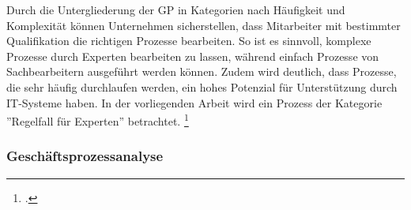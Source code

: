 Durch die Untergliederung der GP in Kategorien nach Häufigkeit und Komplexität können Unternehmen sicherstellen, dass Mitarbeiter mit bestimmter Qualifikation die richtigen Prozesse bearbeiten. So ist es sinnvoll, komplexe Prozesse durch Experten bearbeiten zu lassen, während einfach Prozesse von Sachbearbeitern ausgeführt werden können. Zudem wird deutlich, dass Prozesse, die sehr häufig durchlaufen werden, ein hohes Potenzial für Unterstützung durch IT-Systeme haben. In der vorliegenden Arbeit wird ein Prozess der Kategorie ''Regelfall für Experten'' betrachtet. \footcite[Vgl.][S. 42]{theorie_gadatsch_grundkurs_geschäftsprozessmanagement_2010} 

\subsubsection{Geschäftsprozessanalyse}

